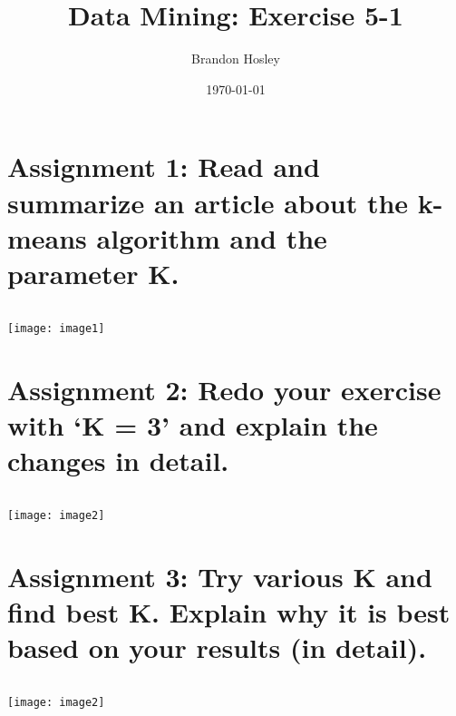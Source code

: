 \documentclass[]{article}
\title{Data Mining: Exercise 5-1}
\author{Brandon Hosley}
\date{\today}
\begin{document}
\maketitle

\section*{Assignment 1: Read and summarize an article about the k-means algorithm and the parameter K.}

\begin{verbatim}

\end{verbatim}
\texttt{[image: image1]}


\section*{Assignment 2: Redo your exercise with ‘K = 3’ and explain the changes in detail.}


\begin{verbatim}

\end{verbatim}
\texttt{[image: image2]}


\section*{Assignment 3: Try various K and find best K. Explain why it is best based on your results (in detail).}

\begin{verbatim}

\end{verbatim}
\texttt{[image: image2]}
\end{document}
